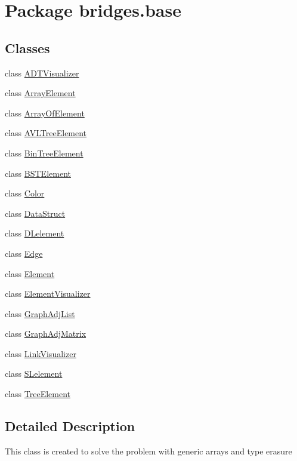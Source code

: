 \hypertarget{namespacebridges_1_1base}{}\section{Package bridges.\+base}
\label{namespacebridges_1_1base}
\subsection*{Classes}
\begin{DoxyCompactItemize}
\item 
class \hyperlink{classbridges_1_1base_1_1_a_d_t_visualizer}{A\+D\+T\+Visualizer}
\item 
class \hyperlink{classbridges_1_1base_1_1_array_element}{Array\+Element}
\item 
class \hyperlink{classbridges_1_1base_1_1_array_of_element}{Array\+Of\+Element}
\item 
class \hyperlink{classbridges_1_1base_1_1_a_v_l_tree_element}{A\+V\+L\+Tree\+Element}
\item 
class \hyperlink{classbridges_1_1base_1_1_bin_tree_element}{Bin\+Tree\+Element}
\item 
class \hyperlink{classbridges_1_1base_1_1_b_s_t_element}{B\+S\+T\+Element}
\item 
class \hyperlink{classbridges_1_1base_1_1_color}{Color}
\item 
class \hyperlink{classbridges_1_1base_1_1_data_struct}{Data\+Struct}
\item 
class \hyperlink{classbridges_1_1base_1_1_d_lelement}{D\+Lelement}
\item 
class \hyperlink{classbridges_1_1base_1_1_edge}{Edge}
\item 
class \hyperlink{classbridges_1_1base_1_1_element}{Element}
\item 
class \hyperlink{classbridges_1_1base_1_1_element_visualizer}{Element\+Visualizer}
\item 
class \hyperlink{classbridges_1_1base_1_1_graph_adj_list}{Graph\+Adj\+List}
\item 
class \hyperlink{classbridges_1_1base_1_1_graph_adj_matrix}{Graph\+Adj\+Matrix}
\item 
class \hyperlink{classbridges_1_1base_1_1_link_visualizer}{Link\+Visualizer}
\item 
class \hyperlink{classbridges_1_1base_1_1_s_lelement}{S\+Lelement}
\item 
class \hyperlink{classbridges_1_1base_1_1_tree_element}{Tree\+Element}
\end{DoxyCompactItemize}


\subsection{Detailed Description}
This class is created to solve the problem with generic arrays and type erasure 